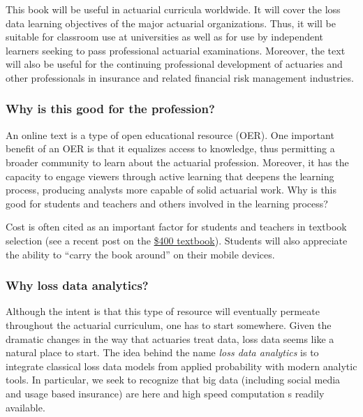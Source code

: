 \documentclass[]{book}
\begin{document}
This book will be useful in actuarial curricula worldwide. It will cover
the loss data learning objectives of the major actuarial organizations.
Thus, it will be suitable for classroom use at universities as well as
for use by independent learners seeking to pass professional actuarial
examinations. Moreover, the text will also be useful for the continuing
professional development of actuaries and other professionals in
insurance and related financial risk management industries.

\subsubsection*{Why is this good for the
profession?}\label{why-is-this-good-for-the-profession}

An online text is a type of open educational resource (OER). One
important benefit of an OER is that it equalizes access to knowledge,
thus permitting a broader community to learn about the actuarial
profession. Moreover, it has the capacity to engage viewers through
active learning that deepens the learning process, producing analysts
more capable of solid actuarial work. Why is this good for students and
teachers and others involved in the learning process?

Cost is often cited as an important factor for students and teachers in
textbook selection (see a recent post on the
\href{https://www.aei.org/publication/the-new-era-of-the-400-college-textbook-which-is-part-of-the-unsustainable-higher-education-bubble/}{\$400
textbook}). Students will also appreciate the ability to ``carry the
book around'' on their mobile devices.

\subsubsection*{Why loss data analytics?}\label{why-loss-data-analytics}

Although the intent is that this type of resource will eventually
permeate throughout the actuarial curriculum, one has to start
somewhere. Given the dramatic changes in the way that actuaries treat
data, loss data seems like a natural place to start. The idea behind the
name \emph{loss data analytics} is to integrate classical loss data
models from applied probability with modern analytic tools. In
particular, we seek to recognize that big data (including social media
and usage based insurance) are here and high speed computation s readily
available.
\end{document}
